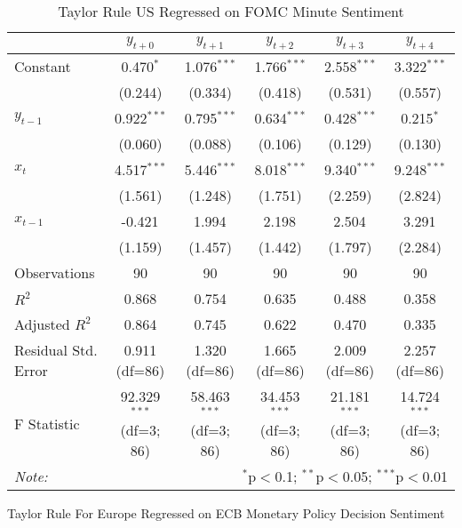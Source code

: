 \documentclass [12pt]{article}
\begin{document}
\begin{table}[H] \centering
  \caption{Taylor Rule US Regressed on FOMC Minute Sentiment}
  \begin{adjustbox}{width=\textwidth}
\begin{tabular}{lccccc}
\hline
\hline
 & $y_{t+0}$ & $y_{t+1}$ & $y_{t+2}$ & $y_{t+3}$ & $y_{t+4}$  \\
\hline
 Constant & 0.470$^{*}$ & 1.076$^{***}$ & 1.766$^{***}$ & 2.558$^{***}$ & 3.322$^{***}$ \\
& (0.244) & (0.334) & (0.418) & (0.531) & (0.557) \\
 $y_{t-1}$ & 0.922$^{***}$ & 0.795$^{***}$ & 0.634$^{***}$ & 0.428$^{***}$ & 0.215$^{*}$ \\
& (0.060) & (0.088) & (0.106) & (0.129) & (0.130) \\
 $x_{t}$ & 4.517$^{***}$ & 5.446$^{***}$ & 8.018$^{***}$ & 9.340$^{***}$ & 9.248$^{***}$ \\
& (1.561) & (1.248) & (1.751) & (2.259) & (2.824) \\
 $x_{t-1}$ & -0.421$^{}$ & 1.994$^{}$ & 2.198$^{}$ & 2.504$^{}$ & 3.291$^{}$ \\
& (1.159) & (1.457) & (1.442) & (1.797) & (2.284) \\
\hline
 Observations & 90 & 90 & 90 & 90 & 90 \\
 $R^2$ & 0.868 & 0.754 & 0.635 & 0.488 & 0.358 \\
 Adjusted $R^2$ & 0.864 & 0.745 & 0.622 & 0.470 & 0.335 \\
 Residual Std. Error & 0.911 (df=86) & 1.320 (df=86) & 1.665 (df=86) & 2.009 (df=86) & 2.257 (df=86) \\
 F Statistic & 92.329$^{***}$ (df=3; 86) & 58.463$^{***}$ (df=3; 86) & 34.453$^{***}$ (df=3; 86) & 21.181$^{***}$ (df=3; 86) & 14.724$^{***}$ (df=3; 86) \\
\hline
\hline
\textit{Note:} & \multicolumn{5}{r}{$^{*}$p$<$0.1; $^{**}$p$<$0.05; $^{***}$p$<$0.01} \\
\end{tabular}
\end{adjustbox}
\end{table}


Taylor Rule For Europe Regressed on ECB Monetary Policy Decision Sentiment
\end{document}
